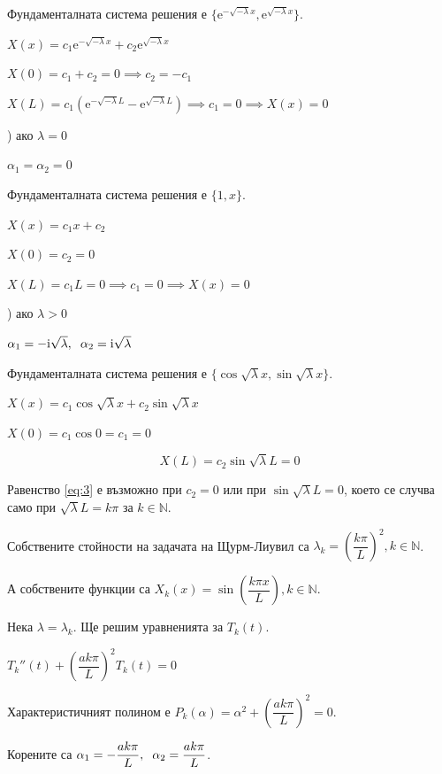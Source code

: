\documentclass[14pt]{extarticle}
\let\frac\dfrac
\newcommand{\me}{\mathrm{e}}
\newcommand{\mi}{\mathrm{i}}
\begin{document}
Фундаменталната система решения е $\{\me^{-\sqrt{-\lambda}x}, \me^{\sqrt{-\lambda}x}\}$.

$X(x) = c_1\me^{-\sqrt{-\lambda}x} + c_2\me^{\sqrt{-\lambda}x}$

$X(0) = c_1 + c_2 = 0 \implies c_2 = -c_1$

$X(L) = c_1\left( \me^{-\sqrt{-\lambda}L} - \me^{\sqrt{-\lambda}L} \right) \implies c_1 = 0 \implies X(x) = 0$

) ако $\lambda = 0$

$ \alpha_1 = \alpha_2 = 0 $

Фундаменталната система решения е $\{1, x\}$.

$X(x) = c_1x + c_2$

$X(0) = c_2 = 0$

$X(L) = c_1L = 0 \implies c_1 = 0 \implies X(x) = 0$

) ако $\lambda > 0$

$ \alpha_1 = -\mi\sqrt{\lambda}, \hspace{2mm} \alpha_2 = \mi\sqrt{\lambda} $

Фундаменталната система решения е $\{ \cos \sqrt{\lambda}x, \sin \sqrt{\lambda}x \}$.

$X(x) = c_1\cos \sqrt{\lambda}x + c_2\sin \sqrt{\lambda}x$

$X(0) = c_1 \cos 0 = c_1 = 0$

\begin{equation}
X(L) = c_2\sin\sqrt{\lambda}L = 0 \tag{3}\label{eq:3}
\end{equation}

Равенство \eqref{eq:3} е възможно при $c_2 = 0$ или при $\sin\sqrt{\lambda}L = 0$, което се случва само при $\sqrt{\lambda}L = k\pi$ за $k \in \mathbb{N}$.

Собствените стойности на задачата на Щурм-Лиувил са $\lambda_k = \left( \frac{k\pi}{L} \right)^2 , k \in \mathbb{N}$.

А собствените функции са $X_k(x) = \sin \left( \frac{k\pi x}{L} \right) , k \in \mathbb{N}$.

Нека $\lambda = \lambda_k$. Ще решим уравненията за $T_k(t)$.

$ T_k''(t) + \left( \frac{ak\pi}{L} \right)^2T_k(t) = 0 $

Характеристичният полином е $ P_k(\alpha) = \alpha^2 + \left( \frac{ak\pi}{L} \right)^2 = 0$.

Корените са $\alpha_1 = -\frac{ak\pi}{L}, \hspace{2mm} \alpha_2 = \frac{ak\pi}{L}$.
\end{document}

